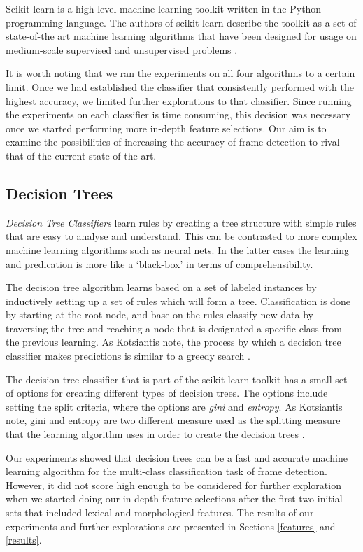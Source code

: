 Scikit-learn is a high-level machine learning toolkit written in the Python programming language. The authors of scikit-learn describe the toolkit as a set of state-of-the art machine learning algorithms that have been designed for usage on medium-scale supervised and unsupervised problems \cite{scikit-learn}.

It is worth noting that we ran the experiments on all four algorithms to a certain limit. Once we had established the classifier that consistently performed with the highest accuracy, we limited further explorations to that classifier. Since running the experiments on each classifier is time consuming, this decision was necessary once we started performing more in-depth feature selections. Our aim is to examine the possibilities of increasing the accuracy of frame detection to rival that of the current state-of-the-art.

\subsection{Decision Trees}

\textit{Decision Tree Classifiers} learn rules by creating a tree structure with simple rules that are easy to analyse and understand. This can be contrasted to more complex machine learning algorithms such as neural nets. In the latter cases the learning and predication is more like a `black-box' in terms of comprehensibility.

The decision tree algorithm learns based on a set of labeled instances by inductively setting up a set of rules which will form a tree. Classification is done by starting at the root node, and base on the rules classify new data by traversing the tree and reaching a node that is designated a specific class from the previous learning. As Kotsiantis note, the process by which a decision tree classifier makes predictions is similar to a greedy search \cite{Kotsiantis:13}.

The decision tree classifier that is part of the scikit-learn toolkit has a small set of options for creating different types of decision trees. The options include setting the split criteria, where the options are \textit{gini} and \textit{entropy}. As Kotsiantis note, gini and entropy are two different measure used as the splitting measure that the learning algorithm uses in order to create the decision trees \cite{Kotsiantis:13}.

Our experiments showed that decision trees can be a fast and accurate machine learning algorithm for the multi-class classification task of frame detection. However, it did not score high enough to be considered for further exploration when we started doing our in-depth feature selections after the first two initial sets that included lexical and morphological features. The results of our experiments and further explorations are presented in Sections \ref{features} and \ref{results}.

